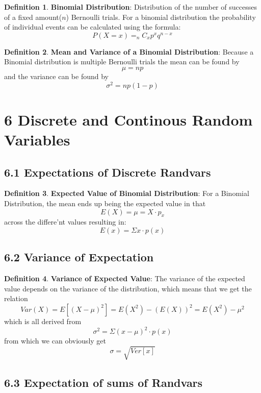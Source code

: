 \documentclass[12pt]{amsart}
\theoremstyle{definition}
\newtheorem{definition}{Definition} %
\numberwithin{equation}{theorem}    %
\begin{document}
\begin{definition}
    \textbf{Binomial Distribution}:
    Distribution of the number of successes of a fixed amount($n$) Bernoulli trials. For a binomial distribution the probability of individual events can be calculated using the formula:
    $$P(X=x) =_nC_x p^xq^{n-x}$$
\end{definition}

\begin{definition}
    \textbf{Mean and Variance of a Binomial Distribution}:
    Because a Binomial distribution is multiple Bernoulli trials the mean can be found by $$\mu = np$$ and the variance can be found by $$\sigma^2 = np(1-p)$$
\end{definition}
 

\section*{6 Discrete and Continous Random Variables}

\subsection*{6.1 Expectations of Discrete Randvars}

\begin{definition}
    \textbf{Expected Value of Binomial Distribution}:
    For a Binomial Distribution, the mean ends up being the expected value in that $$E(X) = \mu = X \cdot p_x$$ across the differe'nt values resulting in:
    $$E(x) = \Sigma x \cdot p(x)$$
\end{definition}

\subsection*{6.2 Variance of Expectation}

\begin{definition}
    \textbf{Variance of Expected Value}:
    The variance of the expected value depends on the variance of the distribution, which means that we get the relation $$Var(X) = E[(X-\mu)^2] = E(X^2) - (E(X))^2 = E(X^2) - \mu^2$$ which is all derived from $$\sigma^2 = \Sigma(x-\mu)^2 \cdot p(x)$$ from which we can obviously get $$\sigma = \sqrt{Ver[x]}$$
\end{definition}

\subsection*{6.3 Expectation of sums of Randvars}
\end{document}
